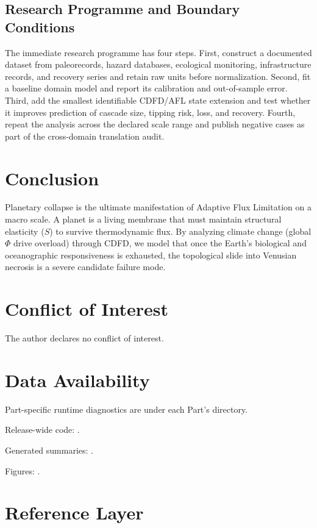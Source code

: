 \documentclass[11pt,a4paper]{article}
\begin{document}
\subsection{Research Programme and Boundary Conditions}

The immediate research programme has four steps. First, construct a documented
dataset from paleorecords, hazard databases, ecological monitoring, infrastructure records, and recovery series and retain raw units before normalization.
Second, fit a baseline domain model and report its calibration and out-of-sample
error. Third, add the smallest identifiable CDFD/AFL state extension and test
whether it improves prediction of cascade size, tipping risk, loss, and recovery. Fourth, repeat the
analysis across the declared scale range and publish negative cases as part of
the cross-domain translation audit.


\section{Conclusion}
Planetary collapse is the ultimate manifestation of Adaptive Flux Limitation on a macro scale. A planet is a living membrane that must maintain structural elasticity ($S$) to survive thermodynamic flux. By analyzing climate change (global $\Phi$ drive overload) through CDFD, we model that once the Earth's biological and oceanographic responsiveness is exhausted, the topological slide into Venusian necrosis is a severe candidate failure mode.
\section*{Conflict of Interest} The author declares no conflict of interest.
\section*{Data Availability}
Part-specific runtime diagnostics are under each Part's  directory.

Release-wide code: .

Generated summaries: .

Figures: .


\section{Reference Layer}


\end{document}
